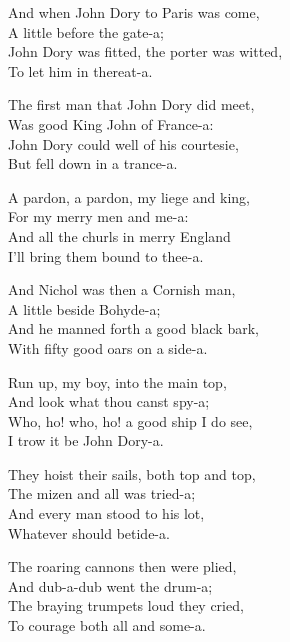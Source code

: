 \begin{dcverse}\begin{altverse}
And when John Dory to Paris was come,\\
A little before the gate-a;\\
John Dory was fitted, the porter was witted,\\
To let him in thereat-a.
\end{altverse}

\begin{altverse}
The first man that John Dory did meet,\\
Was good King John of France-a:\\
John Dory could well of his courtesie,\\
But fell down in a trance-a.
\end{altverse}

\begin{altverse}
A pardon, a pardon, my liege and king,\\
For my merry men and me-a:\\
And all the churls in merry England\\
I’ll bring them bound to thee-a.
\end{altverse}

\begin{altverse}
And Nichol was then a Cornish man,\\
A little beside Bohyde-a;\\
And he manned forth a good black bark,\\
With fifty good oars on a side-a.
\end{altverse}

\begin{altverse}
Run up, my boy, into the main top,\\
And look what thou canst spy-a;\\
Who, ho! who, ho! a good ship I do see,\\
I trow it be John Dory-a.
\end{altverse}

\begin{altverse}
They hoist their sails, both top and top,\\
The mizen and all was tried-a;\\
And every man stood to his lot,\\
Whatever should betide-a.
\end{altverse}

\begin{altverse}
The roaring cannons then were plied,\\
And dub-a-dub went the drum-a;\\
The braying trumpets loud they cried,\\
To courage both all and some-a.
\end{altverse}


\end{dcverse}
